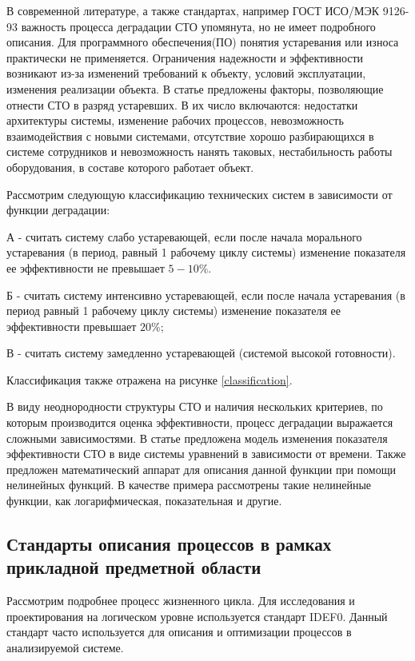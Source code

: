 В современной литературе, а также стандартах, например ГОСТ ИСО/МЭК 9126-93 важность процесса деградации СТО упомянута, но не имеет подробного описания.
Для программного обеспечения(ПО) понятия устаревания или износа практически не применяется.
Ограничения надежности и эффективности возникают из-за изменений требований к объекту, условий эксплуатации, изменения реализации объекта.
В статье \cite{Factors} предложены факторы, позволяющие отнести СТО в разряд устаревших. 
В их число включаются: недостатки архитектуры системы, изменение рабочих процессов, невозможность взаимодействия с новыми системами, 
отсутствие хорошо разбирающихся в системе сотрудников и невозможность нанять таковых, нестабильность работы оборудования, в составе которого работает объект. 

Рассмотрим следующую классификацию технических систем в зависимости от функции деградации:

А - считать систему слабо устаревающей, если после начала морального устаревания (в период, равный 1 рабочему циклу системы) изменение
показателя ее эффективности не превышает $5-10\%$. 

Б - считать систему интенсивно устаревающей, если после начала устаревания (в период равный 1 рабочему циклу системы) изменение показателя ее эффективности превышает $20\%$;

В - считать систему замедленно устаревающей (системой высокой готовности). 

Классификация также отражена на рисунке \ref{classification}.


В виду неоднородности структуры СТО и наличия нескольких критериев, по которым производится оценка эффективности, процесс деградации выражается сложными зависимостями.
В статье \cite{Doronina} предложена модель изменения показателя эффективности СТО в виде системы уравнений в зависимости от времени. 
Также предложен математический аппарат для описания данной функции при помощи нелинейных функций. 
В качестве примера рассмотрены такие нелинейные функции, как логарифмическая, показательная и другие.

\subsection{Стандарты описания процессов в рамках прикладной предметной области}

Рассмотрим подробнее процесс жизненного цикла. 
Для исследования и проектирования на логическом уровне используется стандарт IDEF0. 
Данный стандарт часто используется для описания и оптимизации процессов в анализируемой системе. 

